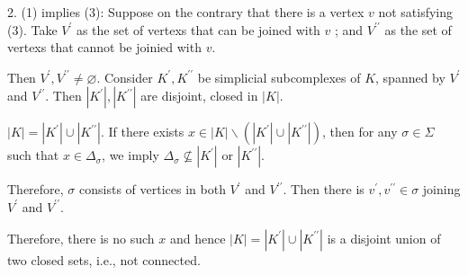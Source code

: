 2. (1) implies (3): Suppose on the contrary that there is a vertex \(v\) not satisfying (3). Take \({V}^{\prime }\) as the set of vertexs that can be joined with \(v\) ; and \({V}^{\prime \prime }\) as the set of vertexs that cannot be joinied with \(v\).

Then \({V}^{\prime },{V}^{\prime \prime } \neq  \varnothing\). Consider \({K}^{\prime },{K}^{\prime \prime }\) be simplicial subcomplexes of \(K\), spanned by \({V}^{\prime }\) and \({V}^{\prime \prime }\). Then \(\left| {K}^{\prime }\right|,\left| {K}^{\prime \prime }\right|\) are disjoint, closed in \(\left| K\right|\).

\(\left| K\right|  = \left| {K}^{\prime }\right|  \cup  \left| {K}^{\prime \prime }\right|\). If there exists \(x \in  \left| K\right|  \smallsetminus  \left( {\left| {K}^{\prime }\right|  \cup  \left| {K}^{\prime \prime }\right| }\right)\), then for any \(\sigma  \in  \Sigma\) such that \(x \in  {\Delta }_{\sigma }\), we imply \({\Delta }_{\sigma } \nsubseteq  \left| {K}^{\prime }\right|\) or \(\left| {K}^{\prime \prime }\right|\).

Therefore, \(\sigma\) consists of vertices in both \({V}^{\prime }\) and \({V}^{\prime \prime }\). Then there is \({v}^{\prime },{v}^{\prime \prime } \in  \sigma\) joining \({V}^{\prime }\) and \({V}^{\prime \prime }\).

Therefore, there is no such \(x\) and hence \(\left| K\right|  = \left| {K}^{\prime }\right|  \cup  \left| {K}^{\prime \prime }\right|\) is a disjoint union of two closed sets, i.e., not connected.